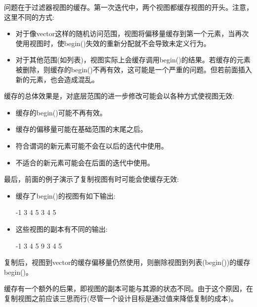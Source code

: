 问题在于过滤器视图的缓存。第一次迭代中，两个视图都缓存视图的开头。注意，这里不同的方式:

\begin{itemize}
\item
对于像vector这样的随机访问范围，视图将偏移量缓存到第一个元素，当再次使用视图时，使begin()失效的重新分配就不会导致未定义行为。

\item
对于其他范围(如列表)，视图实际上会缓存调用begin()的结果。若缓存的元素被删除，则缓存的begin()不再有效，这可能是一个严重的问题。但若前面插入新的元素，也会造成混乱。
\end{itemize}

缓存的总体效果是，对底层范围的进一步修改可能会以各种方式使视图无效:

\begin{itemize}
\item
缓存的begin()可能不再有效。

\item
缓存的偏移量可能在基础范围的末尾之后。

\item
符合谓词的新元素可能不会在以后的迭代中使用。

\item
不适合的新元素可能会在后面的迭代中使用。
\end{itemize}


最后，前面的例子演示了复制视图有时可能会使缓存无效:

\begin{itemize}
\item
缓存了begin()的视图有如下输出:

\begin{shell}
-1 3 4 5
3 4 5
\end{shell}

\item
这些视图的副本有不同的输出:

\begin{shell}
-1 3 4 5
9 3 4 5
\end{shell}

\end{itemize}

复制后，视图到vector的缓存偏移量仍然使用，则删除视图到列表(begin())的缓存begin()。

缓存有一个额外的后果，即视图的副本可能与其源的状态不同。由于这个原因，在复制视图之前应该三思而行(尽管一个设计目标是通过值来降低复制的成本)。

